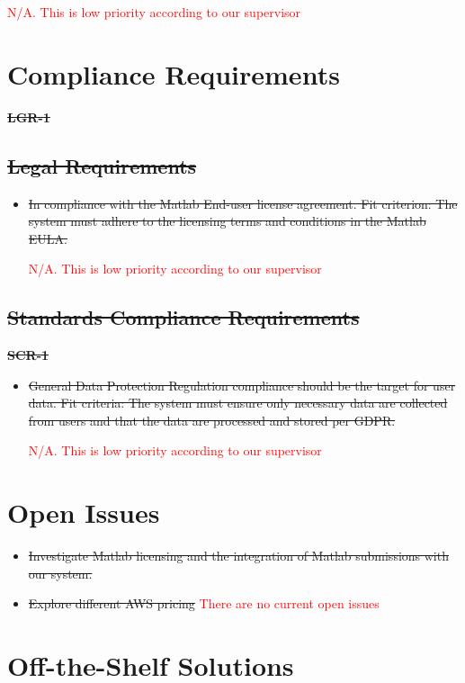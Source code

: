 \documentclass[12pt]{article}
\begin{document}
\textcolor{red}{N/A. This is low priority according to our supervisor}

\section{Compliance Requirements}
\textbf{\sout{LGR-1}}
\subsection{\sout{Legal Requirements}}
\begin{itemize}
    \item \sout{In compliance with the Matlab End-user license agreement. \hfill \break
    Fit criterion: The system must adhere to the licensing terms and conditions in the Matlab EULA.}

    \textcolor{red}{N/A. This is low priority according to our supervisor}

\end{itemize}
\subsection{\sout{Standards Compliance Requirements}}
\textbf{\sout{SCR-1}}
\begin{itemize}
    \item \sout{General Data Protection Regulation compliance should be the target for user data. \hfill \break
    Fit criteria: The system must ensure only necessary data are collected from users and that the data are processed and stored per GDPR. }

    \textcolor{red}{N/A. This is low priority according to our supervisor}

\end{itemize}

\section{Open Issues}
\begin{itemize}
    \item \sout{Investigate Matlab licensing and the integration of Matlab submissions with our system.}
    \item \sout{Explore different AWS pricing}
    \textcolor{red}{There are no current open issues}
\end{itemize}

\section{Off-the-Shelf Solutions}
\end{document}
